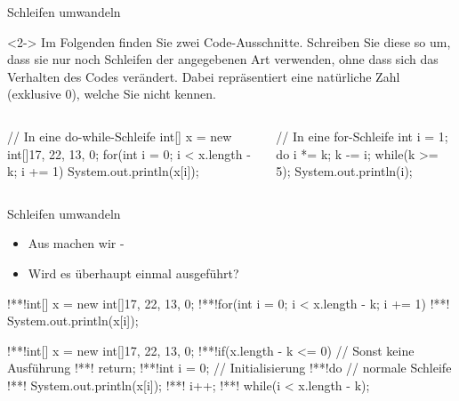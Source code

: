 {
\begin{frame}[fragile,c]{Schleifen umwandeln}
\begin{uncoverenv}<2->
\flushleft Im Folgenden finden Sie zwei Code-Ausschnitte. Schreiben Sie diese so um, dass sie nur noch Schleifen der angegebenen Art verwenden, ohne dass sich das Verhalten des Codes verändert. Dabei repräsentiert  eine natürliche Zahl (exklusive \(0\)), welche Sie nicht kennen.
\begin{columns}[onlytextwidth,T]
\begin{plainjava}
// In eine do-while-Schleife
int[] x = new int[]{17, 22, 13, 0};
for(int i = 0; i < x.length - k; i += 1) {
    System.out.println(x[i]);
}
\end{plainjava}
\begin{plainjava}
// In eine for-Schleife
int i = 1;
do {
    i *= k;
    k -= i;
} while(k >= 5);
System.out.println(i);
\end{plainjava}
\end{columns}
\end{uncoverenv}
%
\end{frame}
\SidebarReset

\SidebarSolution
\begin{frame}[fragile,c]{Schleifen umwandeln}
\begin{itemize}[<+(1)->]
   \itemsep3pt
   \item Aus  machen wir -
   \item Wird es überhaupt einmal ausgeführt?
\end{itemize}
\begin{plainjava}
!**!int[] x = new int[]{17, 22, 13, 0};
!**!for(int i = 0; i < x.length - k; i += 1)
!**!    System.out.println(x[i]);
\end{plainjava}
\vspace*{-1.4\baselineskip}\par\null\qquad{\color{lightgray}\faCaretDown}
\begin{plainjava}
!**!int[] x = new int[]{17, 22, 13, 0};
!**!if(x.length - k <= 0) // Sonst keine Ausführung
!**!   return;
!**!int i = 0; // Initialisierung
!**!do { // normale Schleife
!**!   System.out.println(x[i]);
!**!   i++;
!**!} while(i < x.length - k);
\end{plainjava}
\end{frame}

}
